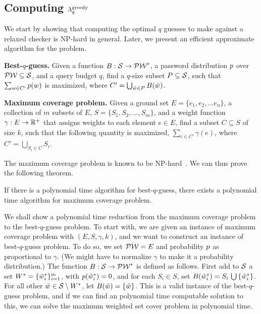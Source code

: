 \subsection{Computing $\lambda^\textnormal{greedy}_q$}
\label{sec:faster-attack}

We start by showing that computing the optimal $q$ guesses to make
against a relaxed checker is NP-hard in general. Later, we present an
efficient approximate algorithm for the problem.


\begin{definition} {\bf Best-$q$-guess.} Given a function
  $B:\mathcal{S} \rightarrow \mathcal{PW}^*$, a password distribution
  $p$ over $\mathcal{PW}\subseteq\mathcal{S}$, and a query budget $q$, find
  a $q$-size subset $P\subseteq \mathcal{S}$, such that
  $\sum_{{w}\in C'}p({w})$ is maximized, where
  $C' = \bigcup_{\tilde{w}\in P}B(\tilde{w})$.
\end{definition}

\begin{definition} {\bf Maximum coverage problem.} Given a ground set
  $E=\{e_1, e_2,\ldots e_n\}$, a collection of $m$ subsets of $E$,
  $S = \{S_1, S_2,\ldots,S_m\}$, and a weight function
  $\gamma:E\rightarrow \mathbb{R}^+$ that assigns weights to each element
  $e\in E$, find a subset $C\subseteq S$ of size $k$, such that
  the following quantity is maximized, $ \sum_{e\in C'}\gamma(e) $,
  where $C' = \bigcup_{S_i\in C} S_i$.
\end{definition}

The maximum coverage problem is known to be
NP-hard~\cite{feige1998threshold}. We can thus prove the
following theorem.

\begin{theorem}
  \label{th:finding-best-q}
  If there is a polynomial time algorithm for best-$q$-guess, there
  exists a polynomial time algorithm for maximum coverage
  problem.
\end{theorem}

\noindent\proof We shall show a polynomial time reduction from the maximum coverage
problem to the best-$q$-guess problem. To start with, we are given an
instance of maximum coverage problem with $(E, S, \gamma, k)$, and we
want to construct an instance of best-$q$-guess problem.  To do so, we
set $\mathcal{PW} = E$ and probability $p$ as proportional to
$\gamma$. (We might have to normalize $\gamma$ to make it a
probability distribution.)  The function
$B:\mathcal{S} \rightarrow \mathcal{PW}^*$ is defined as follows.  First add
to $\mathcal{S}$ a set $W^* = \{\tilde{w}^*_i\}_{i=1}^m$, with
$p(\tilde{w}^*_i) = 0$, and for each $S_i\in S$, set
$B(\tilde{w}^*_i) = S_i \,\bigcup\, \{\tilde{w}^*_i\}$. For all other
$\tilde{w}\in \mathcal{S}\setminus W^*$, let
$B(\tilde{w}) = \{\tilde{w}\}$. This is a valid instance of the
best-$q$-guess problem, and if we can find an polynomial time
computable solution to this, we can solve the maximum weighted set
cover problem in polynomial time. \qedsym

